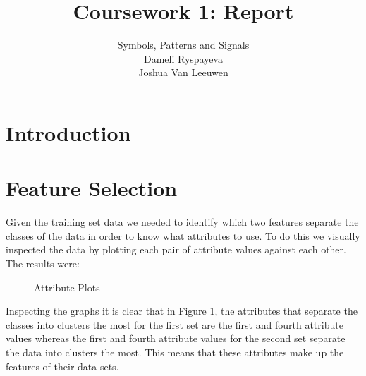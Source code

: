 \documentclass[a4paper, 11pt]{article}
\title{\vspace{-3.0cm}Coursework 1: Report}
\author{
  Symbols, Patterns and Signals\\
  Dameli Ryspayeva\\
  Joshua Van Leeuwen
}
\date{}
\begin{document}
\maketitle



\section*{\vspace{-0.35cm}Introduction}

\section*{\vspace{-0.35cm}Feature Selection}
Given the training set data we needed to identify which two features separate the classes of the data in order to know what attributes to use. To do this we visually inspected the data by plotting each pair of attribute values against each other. The results were:


\captionsetup[subfigure]{labelformat=empty}
\begin{figure}[h!]
    \centering
    \qquad
    \caption{Attribute Plots}%
\end{figure}


Inspecting the graphs it is clear that in Figure 1, the attributes that separate the classes into clusters the most for the first set are the first and fourth attribute values whereas the first and fourth attribute values for the second set separate the data into clusters the most. This means that these attributes make up the features of their data sets.
\end{document}
